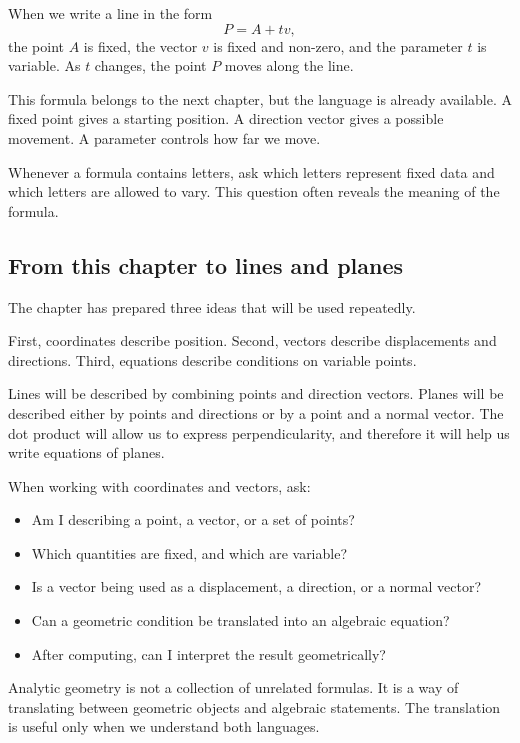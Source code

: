 When we write a line in the form
\[
P=A+t v,
\]
the point \(A\) is fixed, the vector \(v\) is fixed and non-zero, and the parameter \(t\) is variable. As \(t\) changes, the point \(P\) moves along the line.

This formula belongs to the next chapter, but the language is already available. A fixed point gives a starting position. A direction vector gives a possible movement. A parameter controls how far we move.

\begin{remarkbox}
Whenever a formula contains letters, ask which letters represent fixed data and which letters are allowed to vary. This question often reveals the meaning of the formula.
\end{remarkbox}

\subsection*{From this chapter to lines and planes}

The chapter has prepared three ideas that will be used repeatedly.

First, coordinates describe position. Second, vectors describe displacements and directions. Third, equations describe conditions on variable points.

Lines will be described by combining points and direction vectors. Planes will be described either by points and directions or by a point and a normal vector. The dot product will allow us to express perpendicularity, and therefore it will help us write equations of planes.

\begin{summarybox}
When working with coordinates and vectors, ask:
\begin{itemize}
\item Am I describing a point, a vector, or a set of points?
\item Which quantities are fixed, and which are variable?
\item Is a vector being used as a displacement, a direction, or a normal vector?
\item Can a geometric condition be translated into an algebraic equation?
\item After computing, can I interpret the result geometrically?
\end{itemize}
\end{summarybox}

Analytic geometry is not a collection of unrelated formulas. It is a way of translating between geometric objects and algebraic statements. The translation is useful only when we understand both languages.